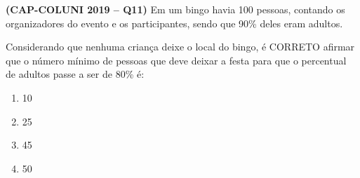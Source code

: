 \textbf{(CAP-COLUNI 2019 -- Q11)} Em um bingo havia 100 pessoas, contando os organizadores do evento e os participantes, sendo que 90\% deles eram adultos.

Considerando que nenhuma criança deixe o local do bingo, é CORRETO afirmar que o número mínimo de pessoas que deve deixar a festa para que o percentual de adultos passe a ser de 80\% é:

\begin{enumerate}
	\item 10
	\item 25
	\item 45
	\item 50
\end{enumerate}
